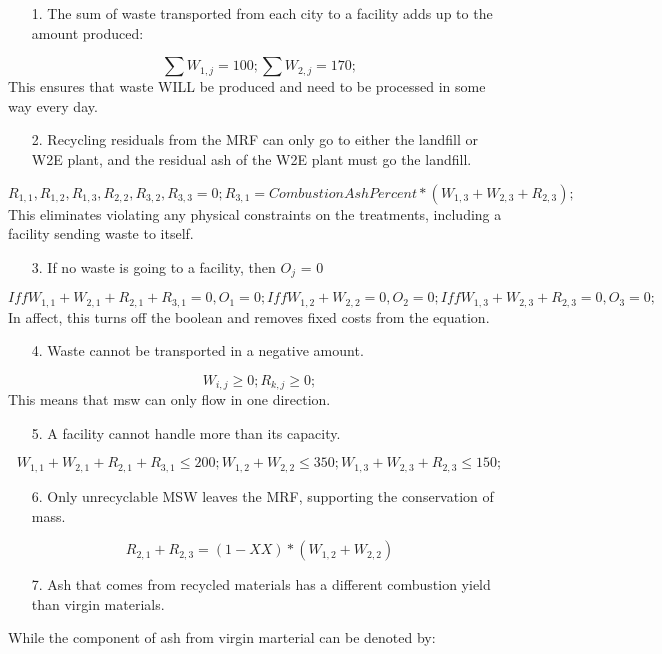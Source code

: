 \documentclass[12pt,a4paper]{article}
\begin{document}
\begin{itemize}
\item[1. ] The sum of waste transported from each city to a facility adds up to the amount produced:

\end{itemize}
\[
\sum W_{1,j} = 100 ;
\sum W_{2,j} = 170 ;
\]
This ensures that waste WILL be produced and need to be processed in some way every day.

\begin{itemize}
\item[2. ] Recycling residuals from the MRF can only go to either the landfill or W2E plant, and the residual ash of the W2E plant must go the landfill.

\end{itemize}
\[
R_{1,1}, R_{1,2}, R_{1,3}, R_{2,2}, R_{3,2}, R_{3,3} = 0;
R_{3,1} = CombustionAshPercent * (W_{1,3} + W_{2,3} + R_{2,3});
\]
This eliminates violating any physical constraints on the treatments, including a facility sending waste to itself.

\begin{itemize}
\item[3. ] If no waste is going to a facility, then $O_j$ = 0

\end{itemize}
\[
Iff W_{1,1} + W_{2,1} + R_{2,1} + R_{3,1} = 0, O_1 = 0;
Iff W_{1,2} + W_{2,2} = 0, O_2 = 0;
Iff W_{1,3} + W_{2,3} + R_{2,3} = 0, O_3 = 0;
\]
In affect, this turns off the boolean and removes fixed costs from the equation.

\begin{itemize}
\item[4. ] Waste cannot be transported in a negative amount.

\end{itemize}
\[
W_{i,j} \geq 0;
R_{k,j} \geq 0;
\]
This means that msw can only flow in one direction.

\begin{itemize}
\item[5. ] A facility cannot handle more than its capacity.

\end{itemize}
\[
W_{1,1} + W_{2,1} + R_{2,1} + R_{3,1}\leq 200;
W_{1,2} + W_{2,2} \leq 350;
W_{1,3} + W_{2,3} + R_{2,3} \leq 150;
\]
\begin{itemize}
\item[6. ] Only unrecyclable MSW leaves the MRF, supporting the conservation of mass.

\end{itemize}
\[
R_{2,1} + R_{2,3} = (1-XX) * (W_{1,2} + W_{2,2})
\]
\begin{itemize}
\item[7. ] Ash that comes from recycled materials has a different combustion yield than virgin materials.

\end{itemize}
While the component of ash from virgin marterial can be denoted by:
\end{document}
